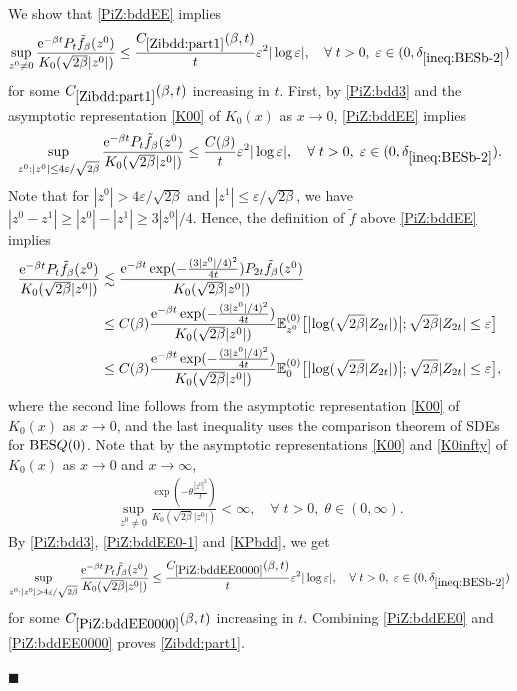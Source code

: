 \documentclass[12pt, twoside]{article}
\numberwithin{figure}{section}
\newcommand{\BES}{{\rm BES}}
\newcommand{\less}{\lesssim}
\newcommand{\e}{{\mathrm e}}
\newcommand{\1}{\mathds 1}
\newcommand{\vep}{{\varepsilon}}
\newcommand{\E}{{\mathbb E}}
\newcommand{\2}{{\mathbf 1}}
\renewenvironment{proof}[1][\proofname]{\noindent {\bfseries #1.}\;}{\hfill\ensuremath{\blacksquare}\\}
\newcommand{\deltaz}{\delta_{\ref{ineq:BESb-2}}}
\begin{document}
\begin{proof}[Proof of Lemma~\ref{lem:PiZbdd}]
We show that \eqref{PiZ:bddEE} implies
\begin{align}\label{Zibdd:part1}
\sup_{z^0\neq 0}\frac{\e^{-\beta t}P_{t}\tilde{f}_\beta( z^0)}{K_0(\sqrt{2\beta}|z^0|)}\leq \frac{C_{\ref{Zibdd:part1}}(\beta,t)}{t}\vep^2|\log\vep|,\quad \forall\;t>0,\;\vep\in (0,\deltaz)
\end{align}
for some $C_{\ref{Zibdd:part1}}(\beta,t)$ increasing in $t$.
First, by \eqref{PiZ:bdd3} and the asymptotic representation \eqref{K00} of $K_0(x)$ as $x\to 0$, \eqref{PiZ:bddEE} implies
\begin{align}
\sup_{z^0:|z^0|\leq 4\vep/\sqrt{2\beta}}\frac{\e^{-\beta t}P_{t}\tilde{f}_\beta( z^0)}{K_0(\sqrt{2\beta}|z^0|)}\leq \frac{C(\beta)}{t}\vep^2|\log\vep|,\quad \forall\;t>0,\;\vep\in(0,\deltaz).\label{PiZ:bddEE0}
\end{align} 
Note that for $|z^0|>4 \vep/\sqrt{2\beta}$ and $|z^1|\leq \vep/\sqrt{2\beta}$, we have $| z^0-z^1|\geq | z^0|-|z^1|\geq 3| z^0|/4$. Hence, the definition of $\tilde{f}$ above \eqref{PiZ:bddEE} implies
\begin{align}
\frac{\e^{-\beta t}P_{t}\tilde{f}_\beta( z^0)}{K_0(\sqrt{2\beta}|z^0|)}&\less \frac{\e^{-\beta t}\exp(-\frac{(3|z^0|/4)^2}{4t})P_{2t}\tilde{f}_{\beta}( z^0)
}{K_0(\sqrt{2\beta}|z^0|)}\notag\\
&\leq C(\beta) \frac{\e^{-\beta t}\exp(-\frac{(3|z^0|/4)^2}{4t})}{K_0(\sqrt{2\beta}|z^0|)} \E^{(0)}_{z^0}\bigl[\bigl|\log (\sqrt{2\beta}|Z_{2t}|)\bigr|;\sqrt{2\beta}|Z_{2t}|\leq \vep\bigr]\notag\\
&\leq C(\beta)\frac{\e^{-\beta t}\exp(-\frac{(3|z^0|/4)^2}{4t})}{K_0(\sqrt{2\beta}|z^0|)} \E^{(0)}_{0}\bigl[\bigl|\log (\sqrt{2\beta}|Z_{2t}|)\bigr|;\sqrt{2\beta}|Z_{2t}|\leq \vep\bigr],\label{PiZ:bddEE0-1}
\end{align}
where the second line follows from the asymptotic representation \eqref{K00} of $K_0(x)$ as $x\to 0$, and the last inequality uses the comparison theorem of SDEs for $\BES Q(0)$. Note that by the asymptotic representations \eqref{K00} and \eqref{K0infty} of $K_0(x)$ as $x\to0$ and $x\to\infty$,
\begin{align}\label{KPbdd}
\sup_{z^0\neq 0}\frac{\exp(-\theta\frac{|z^0|^2}{t})}{K_0(\sqrt{2\beta}|z^0|)}<\infty,\quad \forall\;t>0,\;\theta\in(0,\infty).
\end{align}
By \eqref{PiZ:bdd3}, \eqref{PiZ:bddEE0-1} and \eqref{KPbdd}, we get
\begin{align}\label{PiZ:bddEE0000}
\sup_{z^0:|z^0|> 4\vep/\sqrt{2\beta}}\frac{\e^{-\beta t}P_{t}\tilde{f}_\beta( z^0)}{K_0(\sqrt{2\beta}|z^0|)}\leq \frac{C_{\ref{PiZ:bddEE0000}}(\beta,t)}{t}\vep^2|\log\vep|,\quad \forall\;t>0,\;\vep\in(0,\deltaz)
\end{align}
for some $C_{\ref{PiZ:bddEE0000}}(\beta,t)$ increasing in $t$. Combining \eqref{PiZ:bddEE0} and \eqref{PiZ:bddEE0000} proves \eqref{Zibdd:part1}.


\end{proof}
\end{document}
